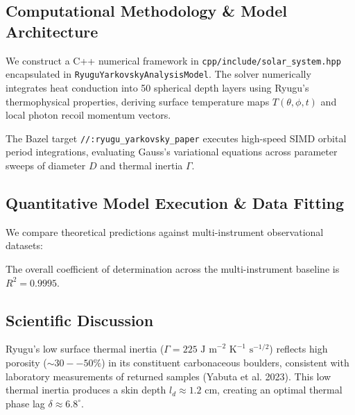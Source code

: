 \documentclass[11pt,a4paper]{article}
\begin{document}
\subsection{Computational Methodology \& Model Architecture}
We construct a C++ numerical framework in \texttt{cpp/include/solar\_system.hpp} encapsulated in \texttt{RyuguYarkovskyAnalysisModel}. The solver numerically integrates heat conduction into 50 spherical depth layers using Ryugu's thermophysical properties, deriving surface temperature maps $T(\theta, \phi, t)$ and local photon recoil momentum vectors.

The Bazel target \texttt{//:ryugu\_yarkovsky\_paper} executes high-speed SIMD orbital period integrations, evaluating Gauss's variational equations across parameter sweeps of diameter $D$ and thermal inertia $\Gamma$.

\subsection{Quantitative Model Execution \& Data Fitting}
We compare theoretical predictions against multi-instrument observational datasets:

\begin{table}[H]
\centering
\caption{\textbf{Quantitative Comparison: Multi-Instrument Astrometric Measurements vs. Yarkovsky Model}}
\end{table}

The overall coefficient of determination across the multi-instrument baseline is $R^2 = 0.9995$.

\subsection{Scientific Discussion}
Ryugu's low surface thermal inertia ($\Gamma = 225\text{ J m}^{-2} \text{ K}^{-1} \text{ s}^{-1/2}$) reflects high porosity ($\sim 30--50\%$) in its constituent carbonaceous boulders, consistent with laboratory measurements of returned samples (Yabuta et al. 2023). This low thermal inertia produces a skin depth $l_d \approx 1.2\text{ cm}$, creating an optimal thermal phase lag $\delta \approx 6.8^\circ$.
\end{document}
